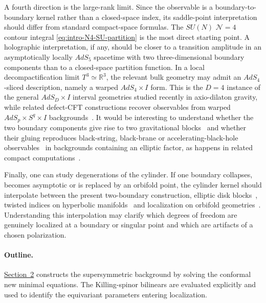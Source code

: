 \documentclass[11pt,a4paper]{article}
\numberwithin{equation}{section}
\theoremstyle{plain}
\theoremstyle{definition}
\theoremstyle{remark}
\begin{document}
A fourth direction is the large-rank limit.  Since the observable is a boundary-to-boundary kernel rather than a closed-space index, its saddle-point interpretation should differ from standard compact-space formulas.  The  \(SU(N)\) \(\mathcal N=4\) contour integral \eqref{eq:intro-N4-SU-partition} is the most direct starting point. A holographic interpretation, if any, should be closer to a transition amplitude in an asymptotically locally \(AdS_5\) spacetime with two three-dimensional boundary components than to a closed-space partition function.  In a local decompactification limit \(T^3\simeq\mathbb R^3\), the relevant bulk geometry may admit an \(AdS_4\)-sliced description, namely a warped \(AdS_4\times I\) form.  This is the \(D=4\) instance of the general \(AdS_D\times I\) interval geometries studied recently in axio-dilaton gravity, while related defect-CFT constructions recover observables from warped \(AdS_p\times S^q\times I\) backgrounds~\cite{Faedo:2026defect,Dibitetto:2026axiodilaton,Dibitetto:2026adsnine}.  It would be interesting to understand whether the two boundary components give rise to two gravitational blocks~\cite{Hosseini:2019iad} and whether their gluing reproduces black-string, black-brane or accelerating-black-hole observables~\cite{Benini:2013cda} in backgrounds containing an elliptic factor, as happens in related compact computations~\cite{Hosseini:2016tor,Hosseini:2019lkt,Hong:2018viz,Inglese:2023wky,Colombo:2024mts}.

Finally, one can study degenerations of the cylinder.  If one boundary collapses, becomes asymptotic or is replaced by an orbifold point, the cylinder kernel should interpolate between the present two-boundary construction, elliptic disk blocks~\cite{Longhi:2019hdh}, twisted indices on hyperbolic manifolds~\cite{Pittelli:2018rpl,Iannotti:2023jji} and localization on orbifold geometries~\cite{Inglese:2023wky,Inglese:2023tyc,Pittelli:2024ugf}.  Understanding this interpolation may clarify which degrees of freedom are genuinely localized at a boundary or singular point and which are artifacts of a chosen polarization.

\paragraph{Outline.}

\hyperref[sec:geometry-loc]{Section~2} constructs the supersymmetric background by solving the conformal new minimal equations. The Killing-spinor bilinears are evaluated explicitly and used to identify the equivariant parameters entering localization.
\end{document}

